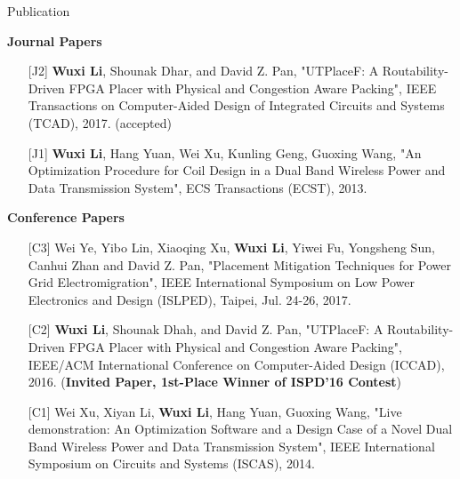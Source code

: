 \documentclass{resume} %
\begin{document}
\begin{rSection}{Publication}

{\bf Journal Papers}
\begin{itemize}
    \item [{[J2]}] \textbf{Wuxi Li}, Shounak Dhar, and David Z. Pan, "UTPlaceF: A Routability-Driven FPGA Placer with Physical and Congestion Aware Packing", IEEE Transactions on Computer-Aided Design of Integrated Circuits and Systems (TCAD), 2017. (accepted)
	\item [{[J1]}] \textbf{Wuxi Li}, Hang Yuan, Wei Xu, Kunling Geng, Guoxing Wang, "An Optimization Procedure for Coil Design in a Dual Band Wireless Power and Data Transmission System", ECS Transactions (ECST), 2013.
\end{itemize}
\vspace{0.3in}
{\bf Conference Papers}
\begin{itemize}
    \item [{[C3]}] Wei Ye, Yibo Lin, Xiaoqing Xu, \textbf{Wuxi Li}, Yiwei Fu, Yongsheng Sun, Canhui Zhan and David Z. Pan, "Placement Mitigation Techniques for Power Grid Electromigration", IEEE International Symposium on Low Power Electronics and Design (ISLPED), Taipei, Jul. 24-26, 2017. 
	\item [{[C2]}] \textbf{Wuxi Li}, Shounak Dhah, and David Z. Pan, "UTPlaceF: A Routability-Driven FPGA Placer with Physical and Congestion Aware Packing", IEEE/ACM International Conference on Computer-Aided Design (ICCAD), 2016. (\textbf{Invited Paper, 1st-Place Winner of ISPD'16 Contest})
    \item [{[C1]}] Wei Xu, Xiyan Li, \textbf{Wuxi Li}, Hang Yuan, Guoxing Wang, "Live demonstration: An Optimization Software and a Design Case of a Novel Dual Band Wireless Power and Data Transmission System", IEEE International Symposium on Circuits and Systems (ISCAS), 2014.
\end{itemize}

\end{rSection}

\end{document}
